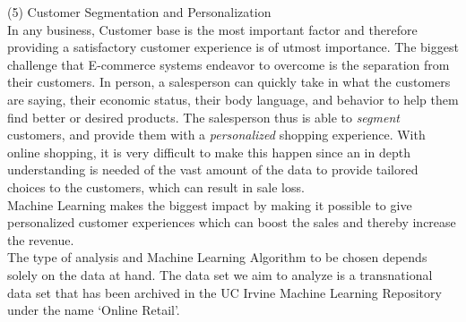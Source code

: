 (5) Customer Segmentation and Personalization \\
In any business, Customer base is the most important factor and therefore providing a satisfactory customer experience is of utmost importance. The biggest challenge that E-commerce systems endeavor to overcome is the separation from their customers. In person, a salesperson can quickly take in what the customers are saying, their economic status, their body language, and behavior to help them find better or desired products. The salesperson thus is able to \emph{segment} customers, and provide them with a \emph{personalized} shopping experience. With online shopping, it is very difficult to make this happen since an in depth understanding is needed of the vast amount of the data to provide tailored choices to the customers, which can result in sale loss. \\
Machine Learning makes the biggest impact by making it possible to give personalized customer experiences which can boost the sales and thereby increase the revenue.\\ 
The type of analysis and Machine Learning Algorithm to be chosen depends solely on the data at hand. The data set we aim to analyze is a transnational data set that has been archived in the UC Irvine Machine Learning Repository under the name `Online Retail'. \\


